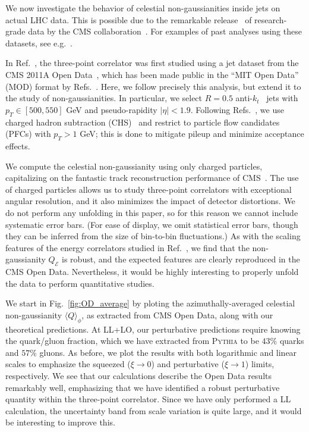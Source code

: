 \documentclass[letterpaper,11pt]{article}
\def\Fig#1{Fig.~{\ref{#1}}}
\def\to{\rightarrow}
\DeclareRobustCommand{\Fig}[1]{Fig.~\ref{#1}}
\DeclareRobustCommand{\Ref}[1]{Ref.~\cite{#1}}
\DeclareRobustCommand{\Refs}[1]{Refs.~\cite{#1}}
\begin{document}
We now investigate the behavior of celestial non-gaussianities inside jets on actual LHC data.
%
This is possible due to the remarkable release~\cite{CERNOpenDataPortal} of research-grade data by the CMS collaboration~\cite{Chatrchyan:2008aa,CMS:OpenAccessPolicy}.
%
For examples of past analyses using these datasets, see e.g.~\cite{Larkoski:2017bvj,Tripathee:2017ybi,PaktinatMehdiabadi:2019ujl,Cesarotti:2019nax,Komiske:2019fks,Lester:2019bso,Apyan:2019ybx,Komiske:2019jim,Bhaduri:2019zkd,refId0,An:2021yqd,Elgammal:2021rne}.



In \Ref{Komiske:2022enw}, the three-point correlator was first studied using a jet dataset from the CMS 2011A Open Data~\cite{CMS:JetPrimary2011A}, which has been made public in the ``MIT Open Data'' (MOD) format by \Refs{Komiske:2019jim,komiske_patrick_2019_3340205}.
%
Here, we follow precisely this analysis, but extend it to the study of non-gaussianities.
%
In particular, we select $R = 0.5$ anti-$k_t$~\cite{Cacciari:2008gp} jets with $p_T \in [500,550]$ GeV and pseudo-rapidity $|\eta| < 1.9$.
%
Following \Refs{Komiske:2019jim}, we use charged hadron subtraction (CHS)~\cite{CMS:2014ata} and restrict to particle flow candidates (PFCs) with $p_T > 1$ GeV; this is done to mitigate pileup and minimize acceptance effects.







We compute the celestial non-gaussianity using only charged particles, capitalizing on the fantastic track reconstruction performance of CMS~\cite{CMS:2014pgm}.
%
The use of charged particles allows us to study three-point correlators with exceptional angular resolution, and it also minimizes the impact of detector distortions.
%
We do not perform any unfolding in this paper, so for this reason we cannot include systematic error bars.
%
(For ease of display, we omit statistical error bars, though they can be inferred from the size of bin-to-bin fluctuations.)
%
As with the scaling features of the energy correlators studied in \Ref{Komiske:2022enw}, we find that the non-gaussianity $Q_{\mathcal{E}}$ is robust, and the expected features are clearly reproduced in the CMS Open Data.
%
Nevertheless, it would be highly interesting to properly unfold the data to perform quantitative studies.




We start in \Fig{fig:OD_average} by ploting the azimuthally-averaged celestial non-gaussianity $\langle Q \rangle_\phi$, as extracted from CMS Open Data, along with our theoretical predictions.
%
At LL+LO, our perturbative predictions require knowing the quark/gluon fraction, which we have extracted from \textsc{Pythia} to be $43\%$ quarks and $57\%$ gluons.
%
As before, we plot the results with both logarithmic and linear scales to emphasize the squeezed ($\xi\to 0$) and perturbative ($\xi\to 1$) limits, respectively.
%
We see that our calculations describe the Open Data results remarkably well, emphasizing that we have identified a robust perturbative quantity within the three-point correlator.
%
Since we have only performed a LL calculation, the uncertainty band from scale variation is quite large, and it would be interesting to improve this.
\end{document}
